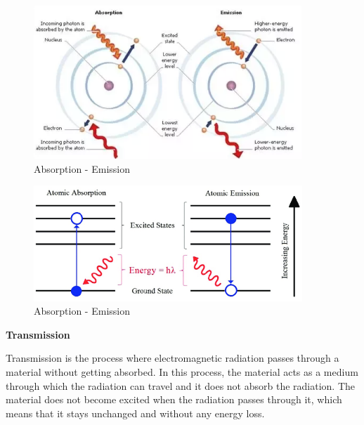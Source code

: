 \documentclass{article}
\begin{document}
{                \begin{figure}[htb]
                    \centering
                    \includegraphics[width=0.9\textwidth]{Figures/atmAbsEm.PNG}
                    \caption{ Absorption - Emission}
                    \label{fig:example}
                \end{figure}
                
                \begin{figure}[htb]
                    \centering
                    \includegraphics[width=0.9\textwidth]{Figures/AbsorbEm.PNG}
                    \caption{ Absorption - Emission}
                    \label{fig:example}
                \end{figure}
                \newpage
                
                \textbf{Transmission}
                \vspace*{1\baselineskip}
                
                \hspace{0.5cm}Transmission is the process where electromagnetic radiation passes through a material without getting absorbed. In this process, the material acts as a medium through which the radiation can travel and it does not absorb the radiation. The material does not become excited when the radiation passes through it, which means that it stays unchanged and without any energy loss.\par
                \vspace*{1\baselineskip}
                
}
\end{document}
